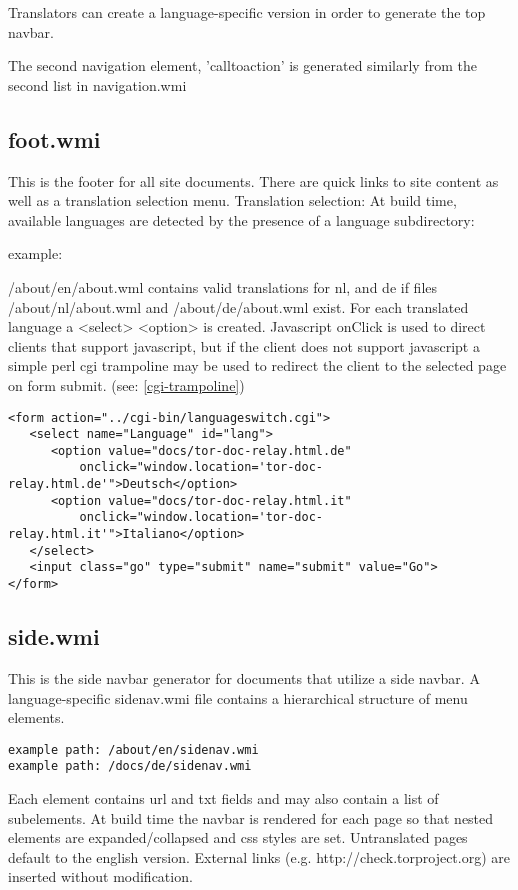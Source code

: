 \documentclass[11pt]{article}
\begin{document}
  Translators can create a language-specific version in order to generate the top navbar.

  The second navigation element, 'calltoaction' is generated similarly from the second list in navigation.wmi
  
\subsection{foot.wmi}
   This is the footer for all site documents. There are quick links to site content as well as a translation selection menu.
   Translation selection:
  At build time, available languages are detected by the presence of a language subdirectory:

  example:

/about/en/about.wml contains valid translations for nl, and de if files /about/nl/about.wml and /about/de/about.wml exist. For each translated language a <select> <option> is created. Javascript onClick is used to direct clients that support javascript, but if the client does not support javascript a simple perl cgi trampoline may be used to redirect the client to the selected page on form submit. (see: \ref{cgi-trampoline})
\begin{verbatim}
<form action="../cgi-bin/languageswitch.cgi">
   <select name="Language" id="lang">
      <option value="docs/tor-doc-relay.html.de"
          onclick="window.location='tor-doc-relay.html.de'">Deutsch</option>
      <option value="docs/tor-doc-relay.html.it"
          onclick="window.location='tor-doc-relay.html.it'">Italiano</option>
   </select>
   <input class="go" type="submit" name="submit" value="Go">
</form>
\end{verbatim}

\label{side-navigation}
\subsection{side.wmi}
This is the side navbar generator for documents that utilize a side navbar. A language-specific sidenav.wmi file contains a hierarchical structure of menu elements.

\begin{verbatim}
example path: /about/en/sidenav.wmi
example path: /docs/de/sidenav.wmi
\end{verbatim}

Each element contains url and txt fields and may also contain a list of subelements. At build time the navbar is rendered for each page so that nested elements are expanded/collapsed and css styles are set. Untranslated pages default to the english version. External links (e.g. http://check.torproject.org) are inserted without modification.
\end{document}
